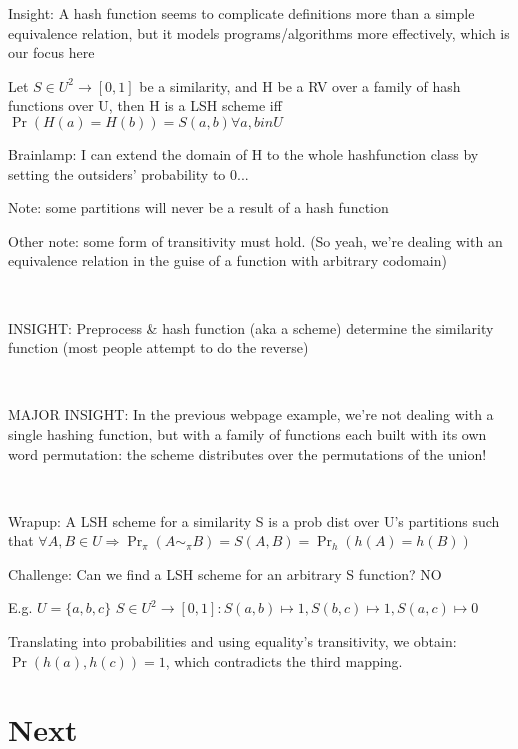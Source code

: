\documentclass{report}
\begin{document}
	Insight: A hash function seems to complicate definitions more than a simple equivalence relation, but it models programs/algorithms more effectively, which is our focus here
	
	
	Let $S \in U^2 \to [0, 1]$ be a similarity, and H be a RV over a family of hash functions over U, then H is a LSH scheme iff $\Pr(H(a)=H(b)) = S(a,b) \forall a,b in U$
	
	Brainlamp: I can extend the domain of H to the whole hashfunction class by setting the outsiders' probability to 0...
	
	
	Note: some partitions will never be a result of a hash function 
	
	Other note: some form of transitivity must hold. (So yeah, we're dealing with an equivalence relation in the guise of a function with arbitrary codomain)
	
	\
	
	INSIGHT: Preprocess \& hash function (aka a scheme) determine the similarity function (most people attempt to do the reverse)
	
	\
	
	MAJOR INSIGHT: In the previous webpage example, we're not dealing with a single hashing function, but with a family of functions each built with its own word permutation: the scheme distributes over the permutations of the union!
	
	\
	
	Wrapup: A LSH scheme for a similarity S is a prob dist over U's partitions such that $\forall A, B \in  U \Rightarrow \Pr_\pi(A\sim_\pi B) = S(A, B) = \Pr_h(h(A)=h(B))$
	
	Challenge: Can we find a LSH scheme for an arbitrary S function? NO
	
	E.g. $U = \{a, b, c\}$
	$S \in U^2 \rightarrow [0, 1] : S(a, b) \mapsto 1, S(b, c) \mapsto 1, S(a, c) \mapsto 0$ %
	
	Translating into probabilities and using equality's transitivity, we obtain: $\Pr(h(a), h(c))=1$, which contradicts the third mapping.
	
	 
	
	
	\chapter{Next}
	
\end{document}
